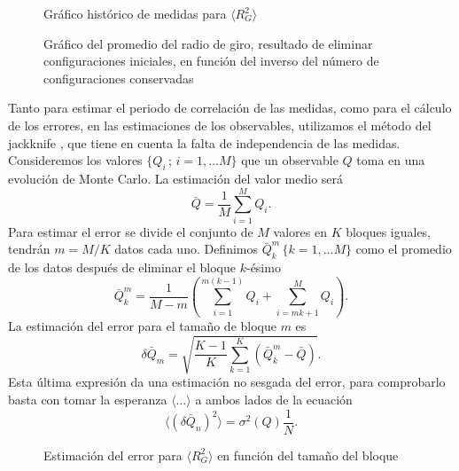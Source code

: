 \begin{figure}[h]
\centering
 \resizebox{\columnwidth}{!}{}\label{grafico_historico}
\caption{Gráfico histórico de medidas para $\langle R_G^2\rangle$}\label{grafico_historico}
\end{figure}    

\begin{figure}[h]
\centering
 \resizebox{\columnwidth}{!}{}
\caption{Gráfico del promedio del radio de giro, resultado de eliminar
  configuraciones iniciales, en función del inverso del número de configuraciones conservadas}\label{grafico_logtermal}
\end{figure}

Tanto para estimar el periodo de correlación de las medidas, como para el
cálculo de los errores, en las estimaciones de los observables, 
utilizamos el método del jackknife \cite{Juan:tesis}, que tiene en cuenta la
falta de independencia de las medidas. Consideremos los valores
$\{Q_i\,;\, i=1,\dots M\}$ que un observable $Q$ toma en una evolución de Monte
Carlo. La estimación del valor medio será
\begin{equation*}
\bar{Q}=\frac{1}{M}\sum^M_{i=1}Q_i.
\end{equation*}
Para estimar el error se divide el conjunto de $M$ valores en $K$ bloques
iguales, tendrán $m=M/K$ datos cada uno. Definimos $\bar{Q}^m_k \, \{k=1,\dots
M\}$ como el promedio de los datos después de eliminar el bloque $k$-ésimo
\begin{equation*}
\bar{Q}_k^m=\frac{1}{M-m}\left(\sum^{m(k-1)}_{i=1}Q_i+\sum^{M}_{i=mk+1}Q_i\right).
\end{equation*}
La estimación del error para el tamaño de bloque $m$ es
\begin{equation*}
\delta\bar{Q}_m=\sqrt{\frac{K-1}{K}\sum^K_{k=1}(\bar{Q}^m_k-\bar{Q})}.
\end{equation*}
Esta última expresión da una estimación no sesgada del error, para comprobarlo
basta con tomar la esperanza $\langle\dots \rangle$ a ambos lados de la ecuación
\begin{equation*}
\langle (\delta\bar{Q}_n)^2\rangle=\sigma^2(Q)\frac{1}{N}. 
\end{equation*}

\begin{figure}[h]
\centering
 \resizebox{\columnwidth}{!}{}
\caption{Estimación del error para $\langle R_G^2\rangle$ en función del tamaño del bloque}\label{figura_ejemplo_error}
\end{figure} 

